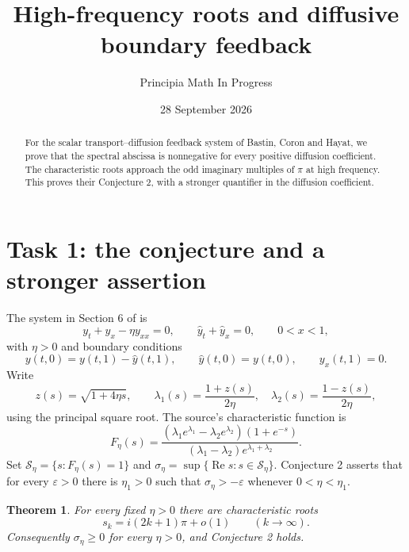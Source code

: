 \documentclass[11pt]{article}
\title{High-frequency roots and diffusive boundary feedback}
\author{Principia Math In Progress}
\date{28 September 2026}
\newtheorem{theorem}{Theorem}
\newcommand{\Ree}{\operatorname{Re}}
\begin{document}
\maketitle
\begin{abstract}
For the scalar transport--diffusion feedback system of Bastin, Coron
and Hayat, we prove that the spectral abscissa is nonnegative for every
positive diffusion coefficient. The characteristic roots approach the
odd imaginary multiples of $\pi$ at high frequency. This proves their
Conjecture 2, with a stronger quantifier in the diffusion coefficient.
\end{abstract}

\section*{Task 1: the conjecture and a stronger assertion}
The system in Section 6 of \cite{BCH} is
\[
 y_t+y_x-\eta y_{xx}=0,\qquad \widehat y_t+\widehat y_x=0,
 \qquad 0<x<1,
\]
with $\eta>0$ and boundary conditions
\[
 y(t,0)=y(t,1)-\widehat y(t,1),\qquad
 \widehat y(t,0)=y(t,0),\qquad y_x(t,1)=0.
\]
Write
\[
 z(s)=\sqrt{1+4\eta s},\qquad
 \lambda_1(s)=\frac{1+z(s)}{2\eta},\quad
 \lambda_2(s)=\frac{1-z(s)}{2\eta},
\]
using the principal square root. The source's characteristic function is
\[
 F_\eta(s)=
 \frac{(\lambda_1e^{\lambda_1}-\lambda_2e^{\lambda_2})(1+e^{-s})}
      {(\lambda_1-\lambda_2)e^{\lambda_1+\lambda_2}}.
\]
Set $\mathcal S_\eta=\{s:F_\eta(s)=1\}$ and
$\sigma_\eta=\sup\{\Ree s:s\in\mathcal S_\eta\}$.
Conjecture 2 asserts that for every $\varepsilon>0$ there is $\eta_1>0$
such that $\sigma_\eta>-\varepsilon$ whenever $0<\eta<\eta_1$.

\begin{theorem}\label{thm}
For every fixed $\eta>0$ there are characteristic roots
\[
 s_k=i(2k+1)\pi+o(1)\qquad(k\longrightarrow\infty).
\]
Consequently $\sigma_\eta\geq0$ for every $\eta>0$, and Conjecture 2 holds.
\end{theorem}
\end{document}
